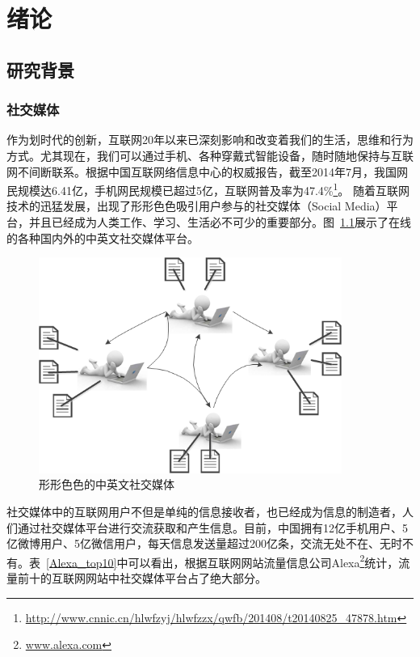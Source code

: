 \chapter{绪论}
\label{Intro}

\section{研究背景}

\subsection{社交媒体}
作为划时代的创新，互联网20年以来已深刻影响和改变着我们的生活，思维和行为方式。尤其现在，我们可以通过手机、各种穿戴式智能设备，随时随地保持与互联网不间断联系。根据中国互联网络信息中心的权威报告，截至2014年7月，我国网民规模达6.41亿，手机网民规模已超过5亿，互联网普及率为47.4\%\footnote{\url{http://www.cnnic.cn/hlwfzyj/hlwfzzx/qwfb/201408/t20140825_47878.htm}}。
随着互联网技术的迅猛发展，出现了形形色色吸引用户参与的社交媒体（Social Media）平台，并且已经成为人类工作、学习、生活必不可少的重要部分。图~\ref{socialmedia}展示了在线的各种国内外的中英文社交媒体平台。

\begin{figure}[htp]
\centering
\includegraphics[height=200pt]{socialmedia.png}
\caption{形形色色的中英文社交媒体}
\label{socialmedia}
\end{figure}

社交媒体中的互联网用户不但是单纯的信息接收者，也已经成为信息的制造者，人们通过社交媒体平台进行交流获取和产生信息。目前，中国拥有12亿手机用户、5亿微博用户、5亿微信用户，每天信息发送量超过200亿条，交流无处不在、无时不有。表~\ref{Alexa_top10}中可以看出，根据互联网网站流量信息公司Alexa\footnote{\url{www.alexa.com}}统计，流量前十的互联网网站中社交媒体平台占了绝大部分。

